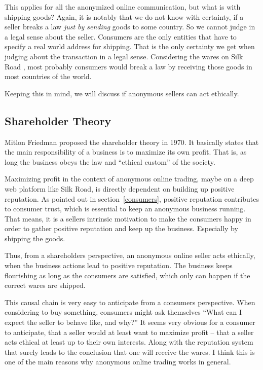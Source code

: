 This applies for all the anonymized online communication, but what is with shipping goods? Again, it is notably that we do not know with certainty, if a seller breaks a law \emph{just by sending} goods to some country. So we cannot judge in a legal sense about the seller. Consumers are the only entities that have to specify a real world address for shipping. That is the only certainty we get when judging about the transaction in a legal sense. Considering the wares on Silk Road \cite{silkroad2013}, most probably consumers would break a law by receiving those goods in most countries of the world.

Keeping this in mind, we will discuss if anonymous sellers can act ethically.

\subsection{Shareholder Theory}

Mitlon Friedman proposed the shareholder theory in 1970. It basically states that the main responsibility of a business is to maximize its own profit. That is, as long the business obeys the law and ``ethical custom'' of the society\cite{shareholder}. 

Maximizing profit in the context of anonymous online trading, maybe on a deep web platform like Silk Road, is directly dependent on building up positive reputation. As pointed out in section~\ref{consumers}, positive reputation contributes to consumer trust, which is essential to keep an anonymous business running. That means, it is a sellers intrinsic motivation to make the consumers happy in order to gather positive reputation and keep up the business. Especially by shipping the goods.

Thus, from a shareholders perspective, an anonymous online seller acts ethically, when the business actions lead to positive reputation. The business keeps flourishing as long as the consumers are satisfied, which only can happen if the correct wares are shipped.

This causal chain is very easy to anticipate from a consumers perspective. When considering to buy something, consumers might ask themselves ``What can I expect the seller to behave like, and why?'' It seems very obvious for a consumer to anticipate, that a seller would at least want to maximize profit -- that a seller acts ethical at least up to their own interests. Along with the reputation system that surely leads to the conclusion that one will receive the wares. I think this is one of the main reasons why anonymous online trading works in general.

